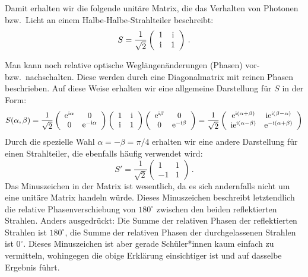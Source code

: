 Damit erhalten wir die folgende unit\"are Matrix, die das Verhalten von Photonen bzw.\
Licht an einem Halbe-Halbe-Strahlteiler beschreibt:
\begin{equation}
\label{eq_STrep1}
                 S = \frac{1}{\sqrt{2}}  \left( \begin{array}{cc}  1 & {\rm i} \\ {\rm i} & 1 \end{array} \right)  \, .
\end{equation}

Man kann noch relative optische Wegl\"angen\"anderungen (Phasen) vor- bzw.\ nachschalten.
Diese werden durch eine Diagonalmatrix mit reinen Phasen beschrieben. 
Auf diese Weise erhalten\index{Phasenschieber}
wir eine allgemeine Darstellung f\"ur $S$ in der Form:
\begin{equation}
        S(\alpha,\beta) = \frac{1}{\sqrt{2}} 
        \left( \begin{array}{cc}  {\rm e}^{{\rm i}\alpha} & 0 \\ 0 & {\rm e}^{-{\rm i}\alpha} \end{array} \right)
          \left( \begin{array}{cc}  1 & {\rm i} \\ {\rm i} & 1 \end{array} \right)
          \left( \begin{array}{cc}  {\rm e}^{{\rm i}\beta} & 0 \\ 0 & {\rm e}^{-{\rm i}\beta} \end{array} \right)
  =  \frac{1}{\sqrt{2}}   
    \left( \begin{array}{cc}  {\rm e}^{{\rm i}(\alpha+\beta)} & {\rm i} {\rm e}^{{\rm i}(\beta-\alpha)} \\ 
                   {\rm i} {\rm e}^{{\rm i}(\alpha-\beta)} & {\rm e}^{-{\rm i}(\alpha+\beta)} \end{array} \right)
\end{equation}
Durch die spezielle Wahl $\alpha = - \beta = \pi/4$ erhalten wir eine andere Darstellung f\"ur
einen Strahlteiler, die ebenfalls h\"aufig verwendet wird:
\begin{equation}
\label{eq_STrep2}
                 S' = \frac{1}{\sqrt{2}}  \left( \begin{array}{cc}  1 & 1 \\ -1 & 1 \end{array} \right)  \, .
\end{equation}
Das Minuszeichen in der Matrix ist 
wesentlich, da es sich andernfalls nicht um eine unit\"are Matrix handeln w\"urde. Dieses Minuszeichen
beschreibt letztendlich die relative Phasenverschiebung von $180^\circ$ zwischen den beiden
reflektierten Strahlen. Anders ausgedr\"uckt: Die Summe der relativen Phasen der reflektierten Strahlen 
ist $180^\circ$, die Summe der relativen Phasen der durchgelassenen Strahlen ist $0^\circ$. 
Dieses Minuszeichen ist aber gerade Sch\"uler*innen kaum einfach zu vermitteln,
wohingegen die obige Erkl\"arung einsichtiger ist und auf dasselbe Ergebnis f\"uhrt. 

